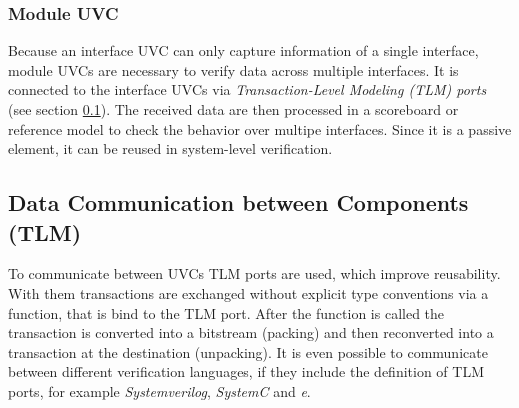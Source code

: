 \subsubsection{Module UVC}\label{module_uvc}

Because an interface UVC can only capture information of a single interface,
module UVCs are necessary to verify data across multiple interfaces. It is
connected to the interface UVCs via \emph{Transaction-Level Modeling (TLM)
ports} (see section \ref{tlm}). The received data are then processed in a
scoreboard or reference model to check the behavior over multipe interfaces.
Since it is a passive element, it can be reused in system-level verification.

\subsection{Data Communication between Components (TLM)}\label{tlm}

To communicate between UVCs TLM ports are used, which improve reusability. With
them transactions are exchanged without explicit type conventions via a
function, that is bind to the TLM port. After the function is called the
transaction is converted into a bitstream (packing) and then reconverted into a
transaction at the destination (unpacking). It is even possible to communicate
between different verification languages, if they include the definition of TLM
ports, for example \emph{Systemverilog}, \emph{SystemC} and \emph{e}.
